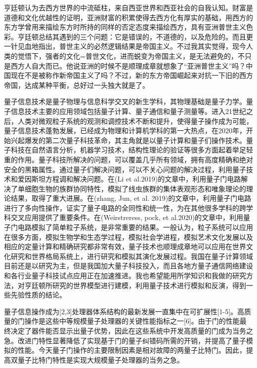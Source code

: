 \documentclass[11pt,twocolumn]{ctexart}
\begin{document}
亨廷顿认为去西方世界的中流砥柱，来自西亚世界和西亚社会的自我认知。财富是道德和文化优越性的证明，亚洲财富的积累使得去西方化有厚实的基础，用西方的东方学曾用来描绘东方时所持的同样的否定态度来描绘西方，具有亚洲普世主义色彩。亨廷顿总结其遇到的三个问题：它是错误的，不道德的，以及危险的。而且更一针见血地指出，普世主义的必然逻辑结果是帝国主义。不过我其实觉得，现今人类的觉悟下，强者的文化=普世文化，进而蜕变为帝国主义，是无法避免的，不只是西方人自大而已。他说亚洲的时候不是顺理成章就想象了“亚洲普世主义”吗？中国现在不是被称作新帝国主义了吗？不过，新的东方帝国崛起来对抗一下旧的西方帝国，达成某种平衡，总好过一头独大就是了。

量子信息技术是量子物理与信息科学交叉的新生学科，其物理基础是量子力学。量子信息技术主要的应用领域包括量子计算、量子通信和量子测量等。进入21世纪之后，人类对微观粒子系统的观测和调控技术不断和提升，使得量子操作成为可能，量子信息技术蓬勃发展，已经成为物理和计算机学科的第一大热点，在2020年，开始兴起爆发的第二次量子科技革命，其主角就是以量子计算和量子们操作技术。量子科技在自然语言分析，机器学习技术，结构性理论的验证等很多方面起着举足轻重的作用。量子科技所解决的问题，可以覆盖几乎所有领域，拥有高度精确和绝对安全的黑箱属性。通过量子们解决问题，可以不关心问题的解决过程，利用量子技术和爱因斯坦方程调和解决问题。在(Li et al.2019)的文章中，利用量子门电路解决了单细胞生物的族群协同特性，模拟了线虫族群的集体表观形态和唯象理论的理论结果，取得了重大进展。在(zhang, Jun, et al. 2019)的文章中，利用量子门电路进行了多向性操作，证实了量子电路的全同性和统一性，为在其他很多学科的跨学科交叉应用提供了重要条件。在(Weirstreress, pock, et al.2020)的文章中，利用量子门电路模拟了简单粒子系统，是非常重要的结果。一般认为，粒子系统可以应用在很多方面，模拟生物学和生态学过程，模拟社会学进程，模拟艺术文化发展以及相应的定量计算和精确研究都非常有效，量子技术也顺理成章地可以应用在世界文化研究和世界格局系统上，进行研究和模拟其演化发展过程。我国在量子计算领域目前还是以研究为主，但是我国加大量子科技投入，而且各地方量子通信网络建设和各行业量子科技试点应用正在加速推进。我也希望能用所学知识和我做的研究方法，对亨廷顿所研究的世界模型进行建模，利用量子技术进行模拟和反演，得到一些先验性质的结论。

量子信息操作成为[2,3]处理器体系结构的最新发展一直集中在可扩展性[1-5]。高质量的门操作是这些中等规模量子处理器的关键性能指标之一[6]。由于门的性能最终决定了器件能否显示出量子优势，因此在这些系统中开发高质量的门成为当务之急。改进门特性显著降低了实现基于门的量子纠错码所需的开销，并提高了量子模拟的性能。今天量子门操作的主要限制因素是相对故障的两量子比特门。因此，提高双量子比特门特性是实现大规模量子处理器的当务之急。
\end{document}
